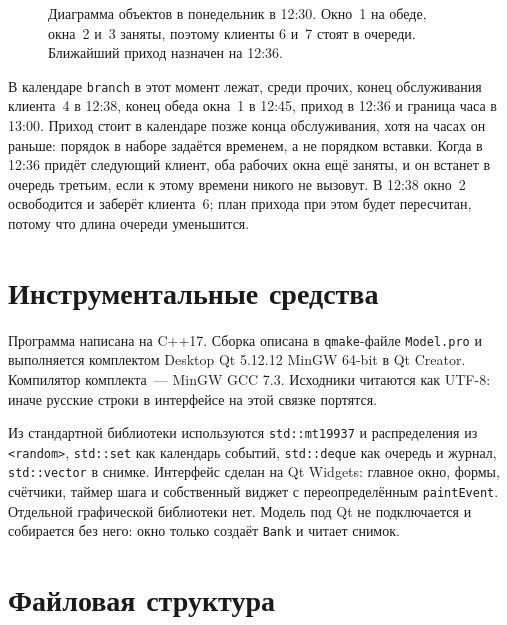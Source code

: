 \documentclass[a4paper,12pt]{article}
\begin{document}
\begin{figure}[H]
\caption{Диаграмма объектов в понедельник в 12:30. Окно~1 на обеде, окна~2 и~3 заняты, поэтому клиенты 6 и~7 стоят в очереди. Ближайший приход назначен на 12:36.}
\label{fig:objects}
\end{figure}

В календаре \texttt{branch} в этот момент лежат, среди прочих, конец обслуживания клиента~4 в 12:38, конец обеда окна~1 в 12:45, приход в 12:36 и граница часа в 13:00. Приход стоит в календаре позже конца обслуживания, хотя на часах он раньше: порядок в наборе задаётся временем, а не порядком вставки. Когда в 12:36 придёт следующий клиент, оба рабочих окна ещё заняты, и он встанет в очередь третьим, если к этому времени никого не вызовут. В 12:38 окно~2 освободится и заберёт клиента~6; план прихода при этом будет пересчитан, потому что длина очереди уменьшится.

\section{Инструментальные средства}

Программа написана на C++17. Сборка описана в \texttt{qmake}-файле \texttt{Model.pro} и выполняется комплектом Desktop Qt 5.12.12 MinGW 64-bit в Qt Creator. Компилятор комплекта~--- MinGW GCC 7.3. Исходники читаются как UTF-8: иначе русские строки в интерфейсе на этой связке портятся.

Из стандартной библиотеки используются \texttt{std::mt19937} и распределения из \texttt{<random>}, \texttt{std::set} как календарь событий, \texttt{std::deque} как очередь и журнал, \texttt{std::vector} в снимке. Интерфейс сделан на Qt Widgets: главное окно, формы, счётчики, таймер шага и собственный виджет с переопределённым \texttt{paintEvent}. Отдельной графической библиотеки нет. Модель под Qt не подключается и собирается без него: окно только создаёт \texttt{Bank} и читает снимок.

\newpage

\section{Файловая структура}
\end{document}
